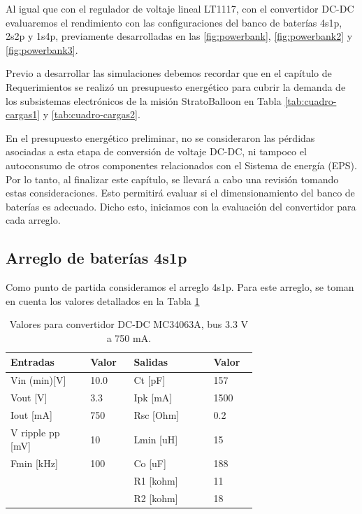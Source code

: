 Al igual que con el regulador de voltaje lineal LT1117, con el convertidor DC-DC evaluaremos el rendimiento con las configuraciones del banco de baterías 4s1p, 2s2p y 1s4p, previamente desarrolladas en las  \ref{fig:powerbank}, \ref{fig:powerbank2} y \ref{fig:powerbank3}.

Previo a desarrollar las simulaciones debemos recordar que en el capítulo de Requerimientos se realizó un presupuesto energético para cubrir la demanda de los subsistemas electrónicos de la misión StratoBalloon en Tabla \ref{tab:cuadro-cargas1} y \ref{tab:cuadro-cargas2}. 

En el presupuesto energético preliminar, no se consideraron las pérdidas asociadas a esta etapa de conversión de voltaje DC-DC, ni tampoco el autoconsumo de otros componentes relacionados con el Sistema de energía (EPS). Por lo tanto, al finalizar este capítulo, se llevará a cabo una revisión tomando estas consideraciones. Esto permitirá evaluar si el dimensionamiento del banco de baterías es adecuado. Dicho esto, iniciamos con la evaluación del convertidor para cada arreglo.

\newpage


\subsection{Arreglo de baterías 4s1p}

Como punto de partida consideramos el arreglo 4s1p. Para este arreglo, se toman en cuenta los valores detallados en la Tabla \ref{tab:valores_33_4s1p}

\begin{table}[h]
    \centering
    \begin{tabular}{p{0.25\linewidth}p{0.1\linewidth}p{0.25\linewidth}p{0.1\linewidth}}
    \hline
    \textbf{Entradas} & \textbf{Valor} & \textbf{Salidas} & \textbf{Valor} \\ \hline
    Vin (min)[V] & 10.0 & Ct [pF] & 157 \\
    Vout [V] & 3.3 & Ipk [mA] & 1500 \\
    Iout [mA] & 750 & Rsc [Ohm] & 0.2 \\
    V ripple pp [mV] & 10 & Lmin [uH] & 15 \\
    Fmin [kHz] & 100 & Co [uF] & 188 \\
    ~ & ~ & R1 [kohm] & 11 \\
    ~ & ~ & R2 [kohm] & 18 \\ \hline
    \end{tabular}
\caption{Valores para convertidor DC-DC MC34063A, bus 3.3 V a 750 mA.}
\label{tab:valores_33_4s1p}
\end{table}

